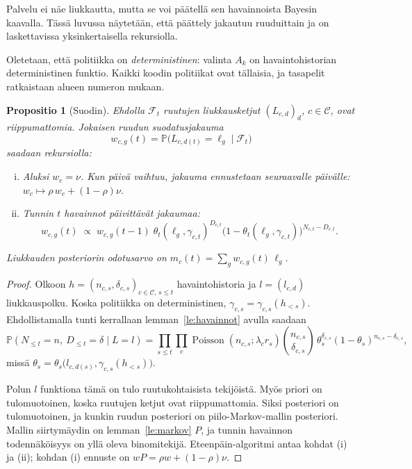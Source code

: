 \documentclass[11pt,a4paper]{article}
\theoremstyle{plain}
\newtheorem{propositio}{Propositio}
\theoremstyle{definition}
\theoremstyle{remark}
\renewcommand{\P}{\mathbb{P}}
\newcommand{\cC}{\mathcal{C}}
\newcommand{\cF}{\mathcal{F}}
\newcommand{\1}{\mathbf{1}}
\newcommand{\Poi}{\operatorname{Poisson}}
\begin{document}
Palvelu ei näe liukkautta, mutta se voi päätellä sen havainnoista Bayesin
kaavalla. Tässä luvussa näytetään, että päättely jakautuu ruuduittain ja on
laskettavissa yksinkertaisella rekursiolla.

Oletetaan, että politiikka on \emph{deterministinen}: valinta $A_k$ on
havaintohistorian deterministinen funktio. Kaikki koodin politiikat ovat
tällaisia, ja tasapelit ratkaistaan alueen numeron mukaan.

\begin{propositio}[Suodin]\label{pr:suodin}
Ehdolla $\cF_t$ ruutujen liukkausketjut $(L_{c,d})_d$, $c \in \cC$, ovat
riippumattomia. Jokaisen ruudun suodatusjakauma
\[
  w_{c,g}(t) = \P\bigl(L_{c,d(t)} = \ell_g \mid \cF_t\bigr)
\]
saadaan rekursiolla:
\begin{enumerate}[(i)]
  \item Aluksi $w_c = \nu$. Kun päivä vaihtuu, jakauma ennustetaan seuraavalle
  päivälle: $w_c \mapsto \rho\, w_c + (1 - \rho)\nu$.
  \item Tunnin $t$ havainnot päivittävät jakaumaa:
  \[
    w_{c,g}(t) \;\propto\; w_{c,g}(t-1)\; \theta_t(\ell_g, \gamma_{c,t})^{D_{c,t}}
    \bigl(1 - \theta_t(\ell_g, \gamma_{c,t})\bigr)^{N_{c,t} - D_{c,t}}.
  \]
\end{enumerate}
Liukkauden posteriorin odotusarvo on $m_c(t) = \sum_g w_{c,g}(t)\, \ell_g$.
\end{propositio}

\begin{proof}
Olkoon $h = (n_{c,s}, \delta_{c,s})_{c \in \cC,\, s \le t}$ havaintohistoria ja
$l = (l_{c,d})$ liukkauspolku. Koska politiikka on deterministinen,
$\gamma_{c,s} = \gamma_{c,s}(h_{<s})$. Ehdollistamalla tunti kerrallaan
lemman~\ref{le:havainnot} avulla saadaan
\[
  \P(N_{\le t} = n,\ D_{\le t} = \delta \mid L = l)
  = \prod_{s \le t} \prod_{c} \Poi(n_{c,s}; \lambda_c r_s)
    \binom{n_{c,s}}{\delta_{c,s}}\, \theta_s^{\delta_{c,s}} (1 - \theta_s)^{n_{c,s} - \delta_{c,s}},
\]
missä $\theta_s = \theta_s\bigl(l_{c,d(s)}, \gamma_{c,s}(h_{<s})\bigr)$.

Polun $l$ funktiona tämä on tulo ruutukohtaisista tekijöistä. Myös priori on
tulomuotoinen, koska ruutujen ketjut ovat riippumattomia. Siksi posteriori on
tulomuotoinen, ja kunkin ruudun posteriori on piilo-Markov-mallin posteriori.
Mallin siirtymäydin on lemman~\ref{le:markov} $P$, ja tunnin havainnon
todennäköisyys on yllä oleva binomitekijä. Eteenpäin-algoritmi antaa kohdat (i)
ja (ii); kohdan (i) ennuste on $wP = \rho w + (1 - \rho)\nu$.
\end{proof}
\end{document}
